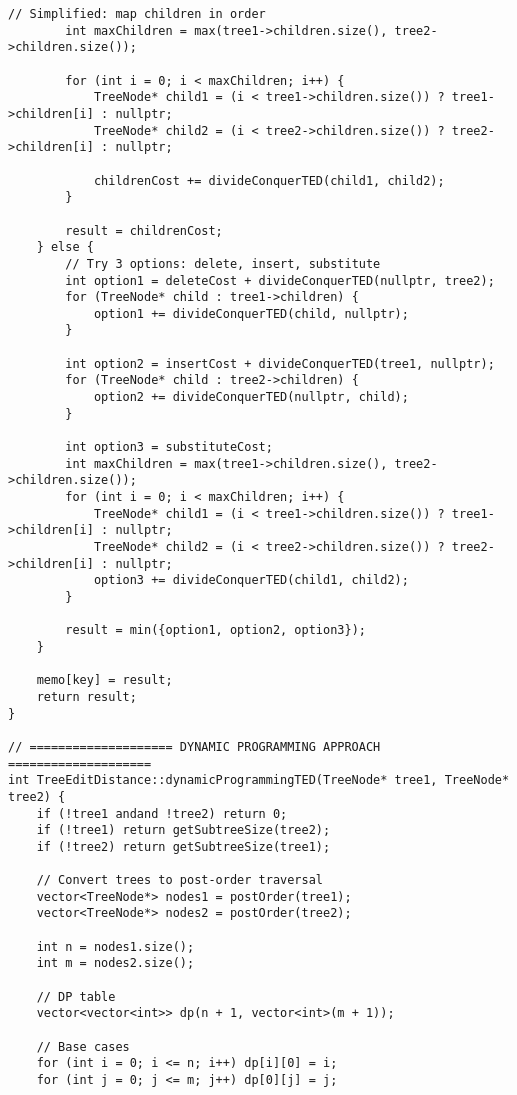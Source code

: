 \documentclass[12pt]{article}
\begin{document}
\begin{lstlisting}[caption=Complete Tree Edit Distance Implementation]
        // Simplified: map children in order
        int maxChildren = max(tree1->children.size(), tree2->children.size());
        
        for (int i = 0; i < maxChildren; i++) {
            TreeNode* child1 = (i < tree1->children.size()) ? tree1->children[i] : nullptr;
            TreeNode* child2 = (i < tree2->children.size()) ? tree2->children[i] : nullptr;
            
            childrenCost += divideConquerTED(child1, child2);
        }
        
        result = childrenCost;
    } else {
        // Try 3 options: delete, insert, substitute
        int option1 = deleteCost + divideConquerTED(nullptr, tree2);
        for (TreeNode* child : tree1->children) {
            option1 += divideConquerTED(child, nullptr);
        }
        
        int option2 = insertCost + divideConquerTED(tree1, nullptr);
        for (TreeNode* child : tree2->children) {
            option2 += divideConquerTED(nullptr, child);
        }
        
        int option3 = substituteCost;
        int maxChildren = max(tree1->children.size(), tree2->children.size());
        for (int i = 0; i < maxChildren; i++) {
            TreeNode* child1 = (i < tree1->children.size()) ? tree1->children[i] : nullptr;
            TreeNode* child2 = (i < tree2->children.size()) ? tree2->children[i] : nullptr;
            option3 += divideConquerTED(child1, child2);
        }
        
        result = min({option1, option2, option3});
    }
    
    memo[key] = result;
    return result;
}

// ==================== DYNAMIC PROGRAMMING APPROACH ====================
int TreeEditDistance::dynamicProgrammingTED(TreeNode* tree1, TreeNode* tree2) {
    if (!tree1 andand !tree2) return 0;
    if (!tree1) return getSubtreeSize(tree2);
    if (!tree2) return getSubtreeSize(tree1);
    
    // Convert trees to post-order traversal
    vector<TreeNode*> nodes1 = postOrder(tree1);
    vector<TreeNode*> nodes2 = postOrder(tree2);
    
    int n = nodes1.size();
    int m = nodes2.size();
    
    // DP table
    vector<vector<int>> dp(n + 1, vector<int>(m + 1));
    
    // Base cases
    for (int i = 0; i <= n; i++) dp[i][0] = i;
    for (int j = 0; j <= m; j++) dp[0][j] = j;
    

\end{lstlisting}
\end{document}
